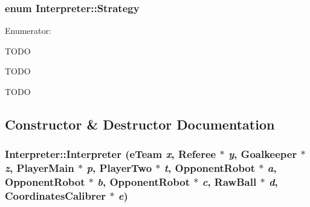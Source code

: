 \hypertarget{classInterpreter_a0fb49436c8c14ca79e13f1cd78119088}{
\subsubsection[{Strategy}]{\setlength{\rightskip}{0pt plus 5cm}enum {\bf Interpreter::Strategy}}}
\label{classInterpreter_a0fb49436c8c14ca79e13f1cd78119088}
\begin{Desc}
\item[Enumerator: ]\par
\begin{description}
\item[{\em 
\hypertarget{classInterpreter_a0fb49436c8c14ca79e13f1cd78119088a8bf993c8b673e31f609171552d65c4c4}{
ATK}
\label{classInterpreter_a0fb49436c8c14ca79e13f1cd78119088a8bf993c8b673e31f609171552d65c4c4}
}]TODO \item[{\em 
\hypertarget{classInterpreter_a0fb49436c8c14ca79e13f1cd78119088ae58df17fd988314c295b980f6a5a6a75}{
DEF}
\label{classInterpreter_a0fb49436c8c14ca79e13f1cd78119088ae58df17fd988314c295b980f6a5a6a75}
}]TODO \item[{\em 
\hypertarget{classInterpreter_a0fb49436c8c14ca79e13f1cd78119088a5509091a7f3746995da83c92dd449187}{
MIX}
\label{classInterpreter_a0fb49436c8c14ca79e13f1cd78119088a5509091a7f3746995da83c92dd449187}
}]TODO \end{description}
\end{Desc}



\subsection{Constructor \& Destructor Documentation}
\hypertarget{classInterpreter_aa43e2d0df9f986ef4bde498aa8eadc04}{
\subsubsection[{Interpreter}]{\setlength{\rightskip}{0pt plus 5cm}Interpreter::Interpreter (eTeam {\em x}, \/  Referee $\ast$ {\em y}, \/  {\bf Goalkeeper} $\ast$ {\em z}, \/  {\bf PlayerMain} $\ast$ {\em p}, \/  {\bf PlayerTwo} $\ast$ {\em t}, \/  {\bf OpponentRobot} $\ast$ {\em a}, \/  {\bf OpponentRobot} $\ast$ {\em b}, \/  {\bf OpponentRobot} $\ast$ {\em c}, \/  RawBall $\ast$ {\em d}, \/  {\bf CoordinatesCalibrer} $\ast$ {\em e})}}
\label{classInterpreter_aa43e2d0df9f986ef4bde498aa8eadc04}

